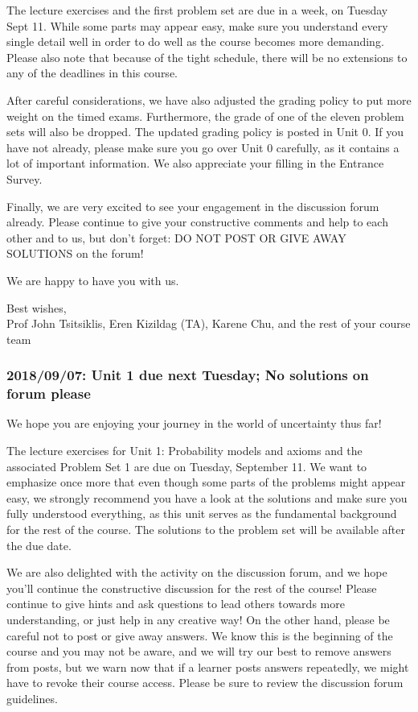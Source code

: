 \documentclass[pdftex, brazil, 12pt, twoside]{article}
\begin{document}
The lecture exercises and the first problem set are due in a week, on Tuesday
Sept 11.  While some parts may appear easy, make sure you understand every single
detail well in order to do well as the course becomes more demanding.  Please also
note that because of the tight schedule, there will be no extensions to any of
the deadlines in this course.
 
After careful considerations, we have also adjusted the grading policy to put more
weight on the timed exams. Furthermore, the grade of one of the eleven problem sets
will also be dropped.  The updated grading policy is posted in Unit 0.  If you have
not already, please make sure you go over Unit 0 carefully, as it contains a lot of
important information. We also appreciate your filling in the Entrance Survey.
 
Finally, we are very excited to see your engagement in the discussion forum already.
Please continue to give your constructive comments and help to each other and to us,
but don’t forget: DO NOT POST OR GIVE AWAY SOLUTIONS on the forum!
 
We are happy to have you with us.

Best wishes,\\
Prof John Tsitsiklis, Eren Kizildag (TA), Karene Chu, and the rest of your course team

\subsubsection{2018/09/07: Unit 1 due next Tuesday; No solutions on forum please}
\label{welcome-updates-2}

We hope you are enjoying your journey in the world of uncertainty thus far!

The lecture exercises for Unit 1: Probability models and axioms and the associated
Problem Set 1 are due on Tuesday, September 11. We want to emphasize once more that
even though some parts of the problems might appear easy, we strongly recommend you
have a look at the solutions and make sure you fully understood everything, as this
unit serves as the fundamental background for the rest of the course. The solutions
to the problem set will be available after the due date.
 
We are also delighted with the activity on the discussion forum, and we hope you'll
continue the constructive discussion for the rest of the course! Please continue to
give hints and ask questions to lead others towards more understanding, or just help
in any creative way! On the other hand, please be careful not to post or give away
answers. We know this is the beginning of the course and you may not be aware, and
we will try our best to remove answers from posts, but we warn now that if a learner
posts answers repeatedly, we might have to revoke their course access. Please be sure
to review the discussion forum guidelines.
 
\end{document}
